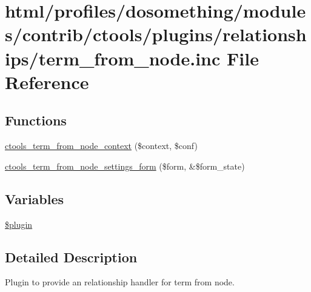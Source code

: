 \hypertarget{term__from__node_8inc}{
\section{html/profiles/dosomething/modules/contrib/ctools/plugins/relationships/term\_\-from\_\-node.inc File Reference}
\label{term__from__node_8inc}
}
\subsection*{Functions}
\begin{DoxyCompactItemize}
\item 
\hyperlink{term__from__node_8inc_ad85e31a6ee118e9c98a7c3279394f7ac}{ctools\_\-term\_\-from\_\-node\_\-context} (\$context, \$conf)
\item 
\hyperlink{term__from__node_8inc_a11e292e2f395a362d9b703b6cc410095}{ctools\_\-term\_\-from\_\-node\_\-settings\_\-form} (\$form, \&\$form\_\-state)
\end{DoxyCompactItemize}
\subsection*{Variables}
\begin{DoxyCompactItemize}
\item 
\hyperlink{term__from__node_8inc_ada8a7130088351710bb02ed622d6bf65}{\$plugin}
\end{DoxyCompactItemize}


\subsection{Detailed Description}
Plugin to provide an relationship handler for term from node. 

